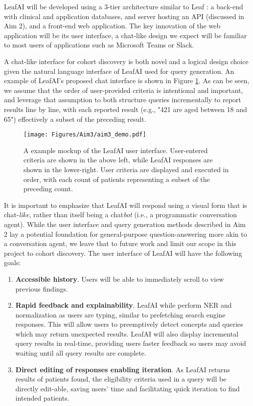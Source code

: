 \documentclass[../main.tex]{subfiles}
\begin{document}
LeafAI will be developed using a 3-tier architecture similar to Leaf \cite{dobbins2019leaf}: a back-end with clinical and application databases, and server hosting an API (discussed in Aim 2), and a front-end web application. The key innovation of the web application will be its user interface, a chat-like design we expect will be familiar to most users of applications such as Microsoft Teams or Slack.

A chat-like interface for cohort discovery is both novel and a logical design choice given the natural language interface of LeafAI used for query generation. An example of LeafAI's proposed chat interface is shown in Figure \ref{aim3_fig_demo}. As can be seen, we assume that the order of user-provided criteria is intentional and important, and leverage that assumption to both structure queries incrementally to report results line by line, with each reported result (e.g., "421 are aged between 18 and 65") effectively a subset of the preceding result.

\begin{figure}[h!]
  \texttt{[image: Figures/Aim3/aim3\_demo.pdf]}  
  \caption{A example mockup of the LeafAI user interface. User-entered criteria are shown in the above left, while LeafAI responses are shown in the lower-right. User criteria are displayed and executed in order, with each count of patients representing a subset of the preceding count.}
\label{aim3_fig_demo}
\end{figure}

It is important to emphasize that LeafAI will respond using a visual form that is chat-\textit{like}, rather than itself being a chat\textit{bot} (i.e., a programmatic conversation agent). While the user interface and query generation methods described in Aim 2 lay a potential foundation for general-purpose question-answering more akin to a conversation agent, we leave that to future work and limit our scope in this project to cohort discovery. The user interface of LeafAI will have the following goals:

\begin{enumerate}
    \item \textbf{Accessible history}. Users will be able to immediately scroll to view previous findings.
    \item \textbf{Rapid feedback and explainability}. LeafAI while perform NER and normalization as users are typing, similar to prefetching search engine responses. This will allow users to preemptively detect concepts and queries which may return unexpected results. LeafAI will also display incremental query results in real-time, providing users faster feedback so users may avoid waiting until all query results are complete.
    \item \textbf{Direct editing of responses enabling iteration}. As LeafAI returns results of patients found, the eligibility criteria used in a query will be directly edit-able, saving users' time and facilitating quick iteration to find intended patients.
\end{enumerate}
\end{document}
